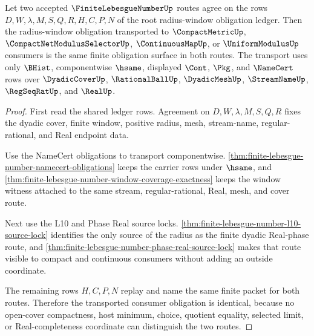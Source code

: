\begin{theorem}
\label{thm:finite-lebesgue-number-root-radius-window-transport}
Let two accepted $\FiniteLebesgueNumberUp$ routes agree on the rows $D,W,\lambda,M,S,Q,R,H,C,P,N$ of the root radius-window obligation ledger. Then the radius-window obligation transported to $\CompactMetricUp$, $\CompactNetModulusSelectorUp$, $\ContinuousMapUp$, or $\UniformModulusUp$ consumers is the same finite obligation surface in both routes. The transport uses only $\BHist$, componentwise $\hsame$, displayed $\Cont$, $\Pkg$, and $\NameCert$ rows over $\DyadicCoverUp$, $\RationalBallUp$, $\DyadicMeshUp$, $\StreamNameUp$, $\RegSeqRatUp$, and $\RealUp$.
\end{theorem}
\begin{proof}
First read the shared ledger rows. Agreement on $D,W,\lambda,M,S,Q,R$ fixes the dyadic cover, finite window, positive radius, mesh, stream-name, regular-rational, and Real endpoint data.

Use the NameCert obligations to transport componentwise. \autoref{thm:finite-lebesgue-number-namecert-obligations} keeps the carrier rows under $\hsame$, and \autoref{thm:finite-lebesgue-number-window-coverage-exactness} keeps the window witness attached to the same stream, regular-rational, Real, mesh, and cover route.

Next use the L10 and Phase Real source locks. \autoref{thm:finite-lebesgue-number-l10-source-lock} identifies the only source of the radius as the finite dyadic Real-phase route, and \autoref{thm:finite-lebesgue-number-phase-real-source-lock} makes that route visible to compact and continuous consumers without adding an outside coordinate.

The remaining rows $H,C,P,N$ replay and name the same finite packet for both routes. Therefore the transported consumer obligation is identical, because no open-cover compactness, host minimum, choice, quotient equality, selected limit, or Real-completeness coordinate can distinguish the two routes.
\end{proof}


